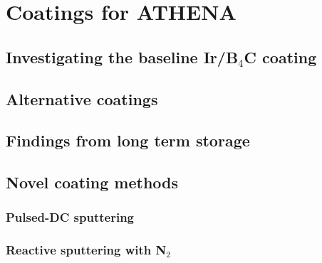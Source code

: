 \chapter{Coatings for ATHENA}

\section{Investigating the baseline Ir/B$_4$C coating}
\section{Alternative coatings}
\section{Findings from long term storage}
\section{Novel coating methods}
\subsection{Pulsed-DC sputtering}

\subsection{Reactive sputtering with N$_2$}
